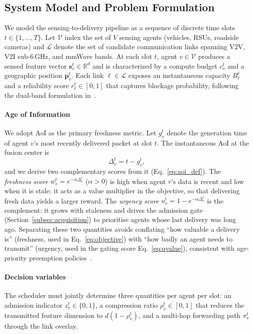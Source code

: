 \documentclass[final,3p,times,review,sort&compress]{elsarticle}
\begin{document}
\subsection{System Model and Problem Formulation}
\label{subsec:problem}

We model the sensing-to-delivery pipeline as a sequence of discrete time slots $t\in\{1,\dots,T\}$. Let $\mathcal{V}$ index the set of $V$ sensing agents (vehicles, RSUs, roadside cameras) and $\mathcal{L}$ denote the set of candidate communication links spanning V2V, V2I sub-6\,GHz, and mmWave bands. At each slot $t$, agent $v\in\mathcal{V}$ produces a sensed feature vector $\mathbf{s}_v^t\in\mathbb{R}^{d}$ and is characterized by a compute budget $c_v^t$ and a geographic position $\mathbf{p}_v^t$. Each link $\ell\in\mathcal{L}$ exposes an instantaneous capacity $B_\ell^t$ and a reliability score $r_\ell^t\in[0,1]$ that captures blockage probability, following the dual-band formulation in~\cite{HE2023100610}.

\paragraph{Age of Information}
We adopt AoI as the primary freshness metric. Let $g_v^t$ denote the generation time of agent $v$’s most recently delivered packet at slot $t$. The instantaneous AoI at the fusion center is
\begin{equation}
\Delta_v^t = t - g_v^t,
\label{eq:aoi_def}
\end{equation}
and we derive two complementary scores from it (Eq.~\ref{eq:aoi_def}). The \emph{freshness score} $w_v^t = e^{-\alpha\Delta_v^t}$ ($\alpha>0$) is high when agent $v$'s data is recent and low when it is stale; it acts as a value multiplier in the objective, so that delivering fresh data yields a larger reward. The \emph{urgency score} $u_v^t = 1 - e^{-\alpha\Delta_v^t}$ is the complement: it grows with staleness and drives the admission gate (Section~\ref{subsec:acquisition}) to prioritise agents whose last delivery was long ago. Separating these two quantities avoids conflating ``how valuable a delivery is'' (freshness, used in Eq.~\eqref{eq:objective}) with ``how badly an agent needs to transmit'' (urgency, used in the gating score Eq.~\eqref{eq:qvalue}), consistent with age-priority preemption policies~\cite{MOHAMMED2025111706}.

\paragraph{Decision variables}
The scheduler must jointly determine three quantities per agent per slot: an admission indicator $z_v^t\in\{0,1\}$, a compression ratio $\rho_v^t\in[0,1]$ that reduces the transmitted feature dimension to $d(1-\rho_v^t)$, and a multi-hop forwarding path $\pi_v^t$ through the link overlay.
\end{document}

